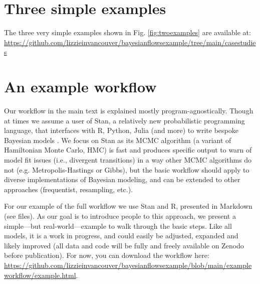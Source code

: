 \documentclass[11pt]{article}
\begin{document}

\section*{Three simple examples}

The three very simple examples shown in Fig. \ref{fig:twoexamples} are available at: \url{https://github.com/lizzieinvancouver/bayesianflowsexample/tree/main/casestudies}

\section*{An example workflow}

Our workflow in the main text is explained mostly program-agnostically. Though at times we assume a user of \textsf{Stan}, a relatively new probabilistic programming language, that interfaces with \textsf{R, Python, Julia} (and more) to write bespoke Bayesian models \citep{Carpenter:2017stan}. We focus on \textsf{Stan} as its MCMC algorithm (a variant of Hamiltonian Monte Carlo, HMC) is fast and produces specific output to warn of model fit issues (i.e., divergent transitions) in a way other MCMC algorithms do not (e.g. Metropolis-Hastings or Gibbs), but the basic workflow should apply to diverse implementations of Bayesian modeling, and can be extended to other approaches (frequentist, resampling, etc.). 

For our example of the full workflow we use \textsf{Stan} and \textsf{R}, presented in Markdown (see files). As our goal is to introduce people to this approach, we present a simple---but real-world---example to walk through the basic steps. Like all models, it is a work in progress, and could easily be adjusted, expanded and likely improved (all data and code will be fully and freely available on Zenodo before publication). For now, you can download the workflow here: \url{https://github.com/lizzieinvancouver/bayesianflowsexample/blob/main/exampleworkflow/example.html}.
\end{document}
